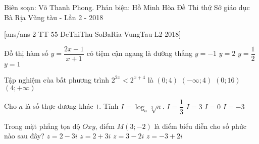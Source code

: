 \begin{name}
	{Biên soạn: Võ Thanh Phong. Phản biện: Hồ Minh Hòa}
	{Đề Thi thử Sở giáo dục Bà Rịa Vũng tàu - Lần 2 - 2018}
\end{name}
\setcounter{ex}{0}
[ans/ans-2-TT-55-DeThiThu-SoBaRia-VungTau-L2-2018]
\begin{ex}%
	Đồ thị hàm số $y=\dfrac{2x-1}{x+1}$ có tiệm cận ngang là đường thẳng
	\choice
	{$y=-1$}
	{\True $y=2$}
	{$y=\dfrac{1}{2}$}
	{$y=1$}
\end{ex}

\begin{ex}%
	Tập nghiệm của bất phương trình $2^{2x}<2^{x+4}$ là
	\choice
	{$(0;4)$}
	{\True $(-\infty;4)$}
	{$(0;16)$}
	{$(4;+\infty)$}
\end{ex}

\begin{ex}%
	Cho $a$ là số thực dương khác $1$. Tính $I=\log _a\sqrt[3]{a}$.
	\choice
	{\True $I=\dfrac{1}{3}$}
	{$I=3$}
	{$I=0$}
	{$I=-3$}
\end{ex}

\begin{ex}%
	Trong mặt phẳng tọa độ $Oxy$, điểm $M(3;-2)$ là điểm biểu diễn cho số phức nào sau đây?
	\choice
	{$z=2-3i$}
	{$z=2+3i$}
	{\True $z=3-2i$}
	{$z=-3+2i$}
\end{ex}

